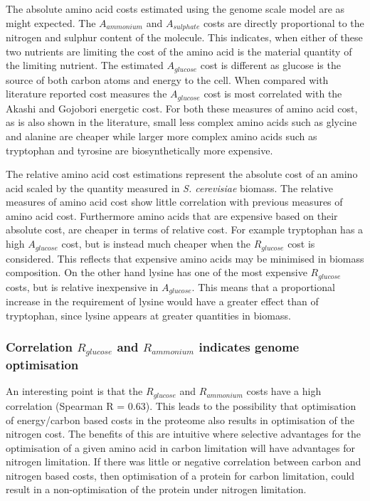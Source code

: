 The absolute amino acid costs estimated using the genome scale model are as might expected. The $A_{ammonium}$ and $A_{sulphate}$ costs are directly proportional to the nitrogen and sulphur content of the molecule. This indicates, when either of these two nutrients are limiting the cost of the amino acid is the material quantity of the limiting nutrient. The estimated $A_{glucose}$ cost is different as glucose is the source of both carbon atoms and energy to the cell. When compared with literature reported cost measures the $A_{glucose}$ cost is most correlated with the Akashi and Gojobori energetic cost. For both these measures of amino acid cost, as is also shown in the literature, small less complex amino acids such as glycine and alanine are cheaper while larger more complex amino acids such as tryptophan and tyrosine are biosynthetically more expensive.

The relative amino acid cost estimations represent the absolute cost of an amino acid scaled by the quantity measured in \emph{S. cerevisiae} biomass. The relative measures of amino acid cost show little correlation with previous measures of amino acid cost. Furthermore amino acids that are expensive based on their absolute cost, are cheaper in terms of relative cost. For example tryptophan has a high $A_{glucose}$ cost, but is instead much cheaper when the $R_{glucose}$ cost is considered. This reflects that expensive amino acids may be minimised in biomass composition. On the other hand lysine has one of the most expensive $R_{glucose}$ costs, but is relative inexpensive in $A_{glucose}$. This means that a proportional increase in the requirement of lysine would have a greater effect than of tryptophan, since lysine appears at greater quantities in biomass.

\subsubsection{Correlation $R_{glucose}$ and $R_{ammonium}$ indicates genome optimisation}%

An interesting point is that the $R_{glucose}$ and $R_{ammonium}$ costs have a high correlation (Spearman R = 0.63). This leads to the possibility that optimisation of energy/carbon based costs in the proteome also results in optimisation of the nitrogen cost. The benefits of this are intuitive where selective advantages for the optimisation of a given amino acid in carbon limitation will have advantages for nitrogen limitation. If there was little or negative correlation between carbon and nitrogen based costs, then optimisation of a protein for carbon limitation, could result in a non-optimisation of the protein under nitrogen limitation.

